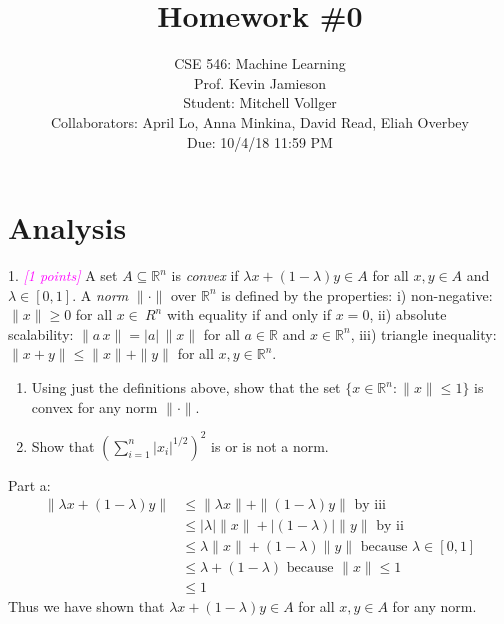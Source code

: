 \documentclass{article}
\date{{}}
\newcommand{\field}[1]{\mathbb{#1}}
\newcommand{\1}{\mathbf{1}}
\newcommand{\R}{\field{R}} %
\newcommand{\grade}[1]{\small\textcolor{magenta}{\emph{[#1 points]}} \normalsize}
\begin{document}
\title{Homework \#0}
\author{\normalsize{CSE 546: Machine Learning}\\
\normalsize{Prof. Kevin Jamieson} \\
\normalsize{Student: Mitchell Vollger} \\
\normalsize{Collaborators: April Lo, Anna Minkina, David Read, Eliah Overbey} \\
\normalsize{Due: 10/4/18  11:59 PM}}
\maketitle


\section{Analysis}
{\color{blue}
1. \grade{1} A set $A \subseteq \R^n$ is \emph{convex} if $\lambda x + (1-\lambda) y \in A$ for all $x,y\in A$ and $\lambda \in [0,1]$.
A \emph{norm} $\|\cdot\|$ over $\R^n$ is defined by the properties:
i) non-negative: $\|x\|\geq 0$ for all $x \in \  R^n$ with equality if and only if $x=0$,
ii) absolute scalability: $\|a \, x\| = |a| \, \|x\|$ for all $a \in \R$ and $x \in \R^n$, iii) triangle inequality: $\|x+y\| \leq \|x\| + \|y\|$ for all $x,y \in \R^n$.
\begin{enumerate}
	\item Using just the definitions above, show that the set $\{ x \in \R^n : \|x\| \leq 1\}$ is convex for any norm $\| \cdot \|$.
	\item Show that $\left(\sum_{i=1}^n |x_i|^{1/2}\right)^2$ is or is not a norm.
\end{enumerate} 
}

Part a:
	\begin{align}
	   	\| \lambda x + (1-\lambda) y \| & \le \|\lambda x\| + \|(1-\lambda)y\| \text{ by iii}\\
	    & \le  |\lambda| \| x\| + |(1-\lambda)| \|y\| \text{ by ii}\\
	    & \le  \lambda \| x\| + (1-\lambda) \|y\| \text{ because $\lambda \in [0,1]$}\\
    	& \le  \lambda + (1-\lambda) \text{ because $\|x\| \le 1$}\\
        & \le 1 
	\end{align}
    Thus we have shown that $\lambda x + (1-\lambda) y \in A$ for all $x,y \in A$ for any norm.\\
	
\end{document}
